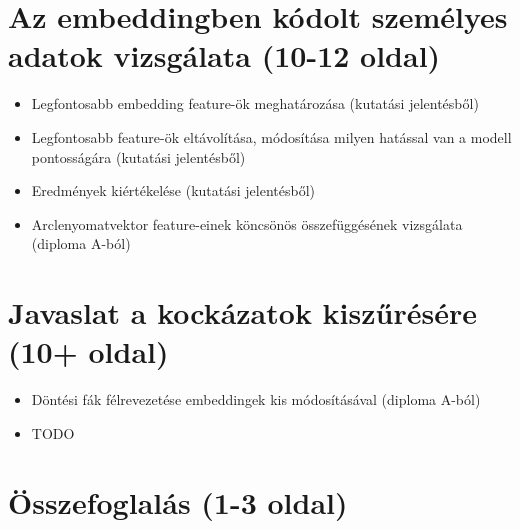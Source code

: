 \section{Az embeddingben kódolt személyes adatok vizsgálata (10-12 oldal)}
\begin{itemize}
	\item Legfontosabb embedding feature-ök meghatározása (kutatási jelentésből)
	\item Legfontosabb feature-ök eltávolítása, módosítása milyen hatással van a modell pontosságára (kutatási jelentésből) 
	\item Eredmények kiértékelése (kutatási jelentésből) 
	\item Arclenyomatvektor feature-einek köncsönös összefüggésének vizsgálata (diploma A-ból)
\end{itemize}


\section{Javaslat a kockázatok kiszűrésére (10+ oldal)}
\begin{itemize}
	\item Döntési fák félrevezetése embeddingek kis módosításával (diploma A-ból)
	\item TODO
\end{itemize}

\section{Összefoglalás (1-3 oldal)}
